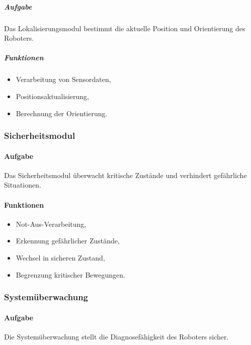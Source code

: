 \documentclass[
  a4paper,
  12pt,
  DIV=12,        %
  parskip=half,  %
  headings=small %
]{scrartcl}
\theoremstyle{definition}
\providecommand{\tightlist}{%
  \setlength{\itemsep}{0pt}\setlength{\parskip}{0pt}}
\theoremstyle{definition}
\begin{document}
\subparagraph{Aufgabe}\label{aufgabe-8}

Das Lokalisierungsmodul bestimmt die aktuelle Position und Orientierung
des Roboters.

\subparagraph{Funktionen}\label{funktionen-2}

\begin{itemize}
\tightlist
\item
  Verarbeitung von Sensordaten,
\item
  Positionsaktualisierung,
\item
  Berechnung der Orientierung.
\end{itemize}

\subsubsection{Sicherheitsmodul}\label{sicherheitsmodul}

\paragraph{Aufgabe}\label{aufgabe-9}

Das Sicherheitsmodul überwacht kritische Zustände und verhindert
gefährliche Situationen.

\paragraph{Funktionen}\label{funktionen-3}

\begin{itemize}
\tightlist
\item
  Not-Aus-Verarbeitung,
\item
  Erkennung gefährlicher Zustände,
\item
  Wechsel in sicheren Zustand,
\item
  Begrenzung kritischer Bewegungen.
\end{itemize}

\subsubsection{Systemüberwachung}\label{systemuxfcberwachung-2}

\paragraph{Aufgabe}\label{aufgabe-10}

Die Systemüberwachung stellt die Diagnosefähigkeit des Roboters sicher.
\end{document}
